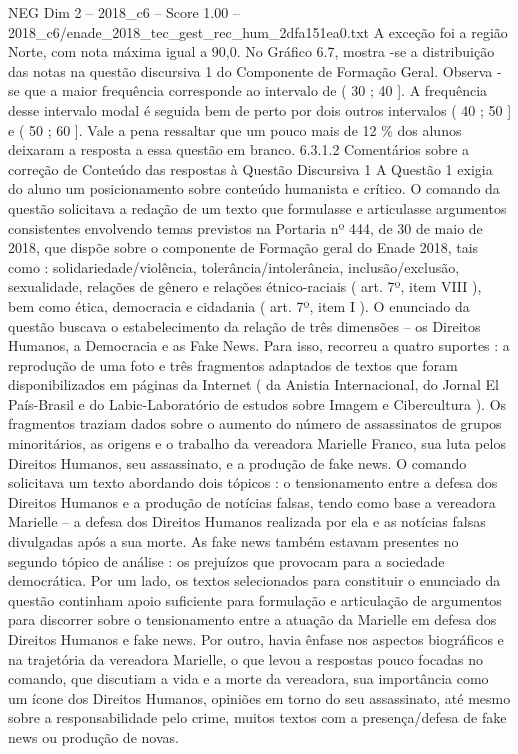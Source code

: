\begin{textsample}{NEG Dim 2 – 2018\_c6 – Score 1.00 – 2018\_c6/enade\_2018\_tec\_gest\_rec\_hum\_2dfa151ea0.txt}
A exceção foi a região Norte, com nota máxima igual a 90,0.
No Gráfico 6.7, mostra -se a distribuição das notas na questão discursiva 1 do Componente de Formação Geral.
Observa -se que a maior frequência corresponde ao intervalo de ( 30 ; 40 ].
A frequência desse intervalo modal é seguida bem de perto por dois outros intervalos ( 40 ; 50 ] e ( 50 ; 60 ].
Vale a pena ressaltar que um pouco mais de 12 \% dos alunos deixaram a resposta a essa questão em branco. 6.3.1.2 Comentários sobre a correção de Conteúdo das respostas à Questão Discursiva 1 A Questão 1 exigia do aluno um posicionamento sobre conteúdo humanista e crítico.
O comando da questão solicitava a redação de um texto que formulasse e articulasse argumentos consistentes envolvendo temas previstos na Portaria nº 444, de 30 de maio de 2018, que dispõe sobre o componente de Formação geral do Enade 2018, tais como : solidariedade/violência, tolerância/intolerância, inclusão/exclusão, sexualidade, relações de gênero e relações étnico-raciais ( art. 7º, item VIII ), bem como ética, democracia e cidadania ( art. 7º, item I ).
O enunciado da questão buscava o estabelecimento da relação de três dimensões – os Direitos Humanos, a Democracia e as Fake News.
Para isso, recorreu a quatro suportes : a reprodução de uma foto e três fragmentos adaptados de textos que foram disponibilizados em páginas da Internet ( da Anistia Internacional, do Jornal El País-Brasil e do Labic-Laboratório de estudos sobre Imagem e Cibercultura ).
Os fragmentos traziam dados sobre o aumento do número de assassinatos de grupos minoritários, as origens e o trabalho da vereadora Marielle Franco, sua luta pelos Direitos Humanos, seu assassinato, e a produção de fake news.
O comando solicitava um texto abordando dois tópicos : o tensionamento entre a defesa dos Direitos Humanos e a produção de notícias falsas, tendo como base a vereadora Marielle – a defesa dos Direitos Humanos realizada por ela e as notícias falsas divulgadas após a sua morte.
As fake news também estavam presentes no segundo tópico de análise : os prejuízos que provocam para a sociedade democrática.
Por um lado, os textos selecionados para constituir o enunciado da questão continham apoio suficiente para formulação e articulação de argumentos para discorrer sobre o tensionamento entre a atuação da Marielle em defesa dos Direitos Humanos e fake news.
Por outro, havia ênfase nos aspectos biográficos e na trajetória da vereadora Marielle, o que levou a respostas pouco focadas no comando, que discutiam a vida e a morte da vereadora, sua importância como um ícone dos Direitos Humanos, opiniões em torno do seu assassinato, até mesmo sobre a responsabilidade pelo crime, muitos textos com a presença/defesa de fake news ou produção de novas.

\end{textsample}
